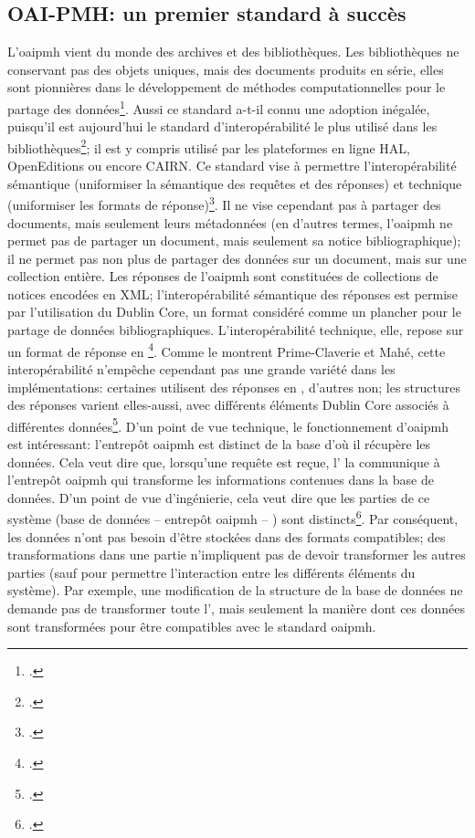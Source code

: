 \subsection{OAI-PMH: un premier standard à succès}
L'\gls{oaipmh} vient du monde des archives et des bibliothèques. Les bibliothèques ne conservant pas des objets uniques, mais des documents produits en série, elles sont pionnières dans le développement de méthodes computationnelles pour le partage des données\footcite[p. 2-3]{prime-claverie_defi_2017}. Aussi ce standard a-t-il connu une adoption inégalée, puisqu'il est aujourd'hui le standard d'interopérabilité le plus utilisé dans les bibliothèques\footcite[p. 5]{prime-claverie_defi_2017}; il est y compris utilisé par les plateformes en ligne HAL, OpenEditions ou encore CAIRN. Ce standard vise à permettre l'interopérabilité sémantique (uniformiser la sémantique des requêtes et des réponses) et technique (uniformiser les formats de réponse)\footcite[p. 6-14]{prime-claverie_defi_2017}. Il ne vise cependant pas à partager des documents, mais seulement leurs métadonnées (en d'autres termes, l'\gls{oaipmh} ne permet pas de partager un document, mais seulement sa notice bibliographique); il ne permet pas non plus de partager des données sur un document, mais sur une collection entière. Les réponses de l'\gls{oaipmh} sont constituées de collections de notices encodées en XML; l'interopérabilité sémantique des réponses est permise par l'utilisation du Dublin Core, un format considéré comme un plancher pour le partage de données bibliographiques. L'interopérabilité technique, elle, repose sur un format de réponse en \xml{}\footcite[p. 4]{prime-claverie_defi_2017}. Comme le montrent Prime-Claverie et Mahé, cette interopérabilité n'empêche cependant pas une grande variété dans les implémentations: certaines utilisent des réponses en \xmltei{}, d'autres non; les structures des réponses varient elles-aussi, avec différents éléments Dublin Core associés à différentes données\footcite[p. 6-14]{prime-claverie_defi_2017}. D'un point de vue technique, le fonctionnement d'\gls{oaipmh} est intéressant: l'entrepôt \gls{oaipmh} est distinct de la base d'où il récupère les données. Cela veut dire que, lorsqu'une requête est reçue, l'\api{} la communique à l'entrepôt \gls{oaipmh} qui transforme les informations contenues dans la base de données. D'un point de vue d'ingénierie, cela veut dire que les parties de ce système (base de données -- entrepôt \gls{oaipmh} -- \api{}) sont distincts\footcite[p. 4]{prime-claverie_defi_2017}. Par conséquent, les données n'ont pas besoin d'être stockées dans des formats compatibles; des transformations dans une partie n'impliquent pas de devoir transformer les autres parties (sauf pour permettre l'interaction entre les différents éléments du système). Par exemple, une modification de la structure de la base de données ne demande pas de transformer toute l'\api{}, mais seulement la manière dont ces données sont transformées pour être compatibles avec le standard \gls{oaipmh}. 

